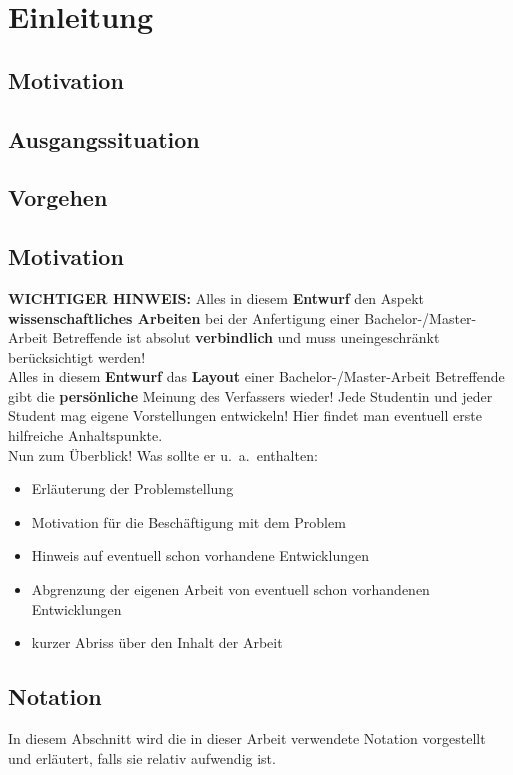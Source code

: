 \chapter{Einleitung}
\label{chap:einleitung}

\section{Motivation}
\section{Ausgangssituation}
\section{Vorgehen}

\section{Motivation}
{\bf WICHTIGER HINWEIS:} 
Alles in diesem {\bf Entwurf} den Aspekt
{\bf wissenschaftliches Arbeiten} bei der Anfertigung einer
Bachelor-/Master-Arbeit 
Betreffende ist absolut {\bf verbindlich} und muss uneingeschränkt
berücksichtigt werden! \\[0.1cm]
Alles in diesem {\bf Entwurf} das 
{\bf Layout} einer Bachelor-/Master-Arbeit Betreffende gibt die 
{\bf persönliche} Meinung des 
Verfassers wieder! Jede Studentin und jeder Student mag eigene Vorstellungen
entwickeln! Hier findet man eventuell erste hilfreiche Anhaltspunkte. \\[0.1cm]
Nun zum Überblick! Was sollte er u.\ a.\ enthalten:
\begin{itemize}
\itemsep -6pt
\item Erläuterung der Problemstellung 
\item Motivation für die Beschäftigung mit dem Problem
\item Hinweis auf eventuell schon vorhandene Entwicklungen 
\item Abgrenzung der eigenen Arbeit von eventuell schon vorhandenen
      Entwicklungen 
\item kurzer Abriss über den Inhalt der Arbeit
\end{itemize}

\section{Notation}
In diesem Abschnitt wird die in dieser Arbeit verwendete Notation 
vorgestellt und erläutert, falls sie relativ aufwendig ist.

